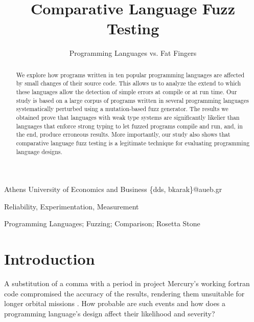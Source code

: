 \documentclass[10pt]{sigplanconf}
\begin{document}
\copyrightdata{[to be supplied]}


\title{Comparative Language Fuzz Testing}
\subtitle{Programming Languages vs. Fat Fingers}

  {Athens University of Economics and Business}
  {\{dds, bkarak\}@aueb.gr}

\maketitle

\begin{abstract}
We explore how programs written in ten popular programming languages
are affected by small changes of their source code.
This allows us to analyze the extend to which these languages
allow the detection of simple errors at compile or at run time.
Our study is based on a large corpus of programs written in several programming
languages systematically perturbed using a mutation-based fuzz generator.
The results we obtained
prove that languages with weak type systems are significantly
likelier than languages that enforce strong typing to let fuzzed programs
compile and run, and, in the end, produce erroneous results.
More importantly, our study also shows that comparative language fuzz testing
is a legitimate technique for evaluating programming language designs.
\end{abstract}


\terms
Reliability, Experimentation, Measurement

\keywords
Programming Languages; Fuzzing; Comparison; Rosetta Stone

\section{Introduction} %
A substitution of a comma with a period in project Mercury's working
{\sc fortran} code compromised the accuracy of the results,
rendering them unsuitable for longer orbital missions \cite{Brad89,Neu95}.
How probable are such events and how does a programming language's
design affect their likelihood and severity?
\end{document}
